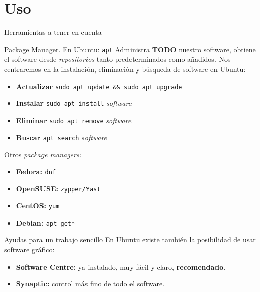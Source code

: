 \documentclass[12pt]{beamer}
\begin{document}
\section{Uso}
\begin{frame}[allowframebreaks]{Herramientas a tener en cuenta}
	\begin{block}{Package Manager. En Ubuntu: \texttt{apt}}
		Administra \textbf{TODO} nuestro software, obtiene el software desde \textit{repositorios} tanto predeterminados como añadidos. Nos centraremos en la instalación, eliminación y búsqueda de software en Ubuntu:
		\begin{itemize}
			\item \textbf{Actualizar} \texttt{sudo apt update \&\& sudo apt upgrade}
			\item \textbf{Instalar} \texttt{sudo apt install} \textit{software}
			\item \textbf{Eliminar} \texttt{sudo apt remove} \textit{software}
			\item \textbf{Buscar} \texttt{apt search} \textit{software}
		\end{itemize}
	\end{block}
	Otros \textit{package managers:}
	\begin{itemize}
		\item \textbf{Fedora:} \texttt{dnf}
		\item \textbf{OpenSUSE:} \texttt{zypper/Yast}
		\item \textbf{CentOS:} \texttt{yum}
		\item \textbf{Debian:} \texttt{apt-get*}
	\end{itemize}
	\begin{block}{Ayudas para un trabajo sencillo}
		En Ubuntu existe también la posibilidad de usar software gráfico:
		\begin{itemize}
			\item \textbf{Software Centre:} ya instalado, muy fácil y claro, \textbf{recomendado}.
			\item \textbf{Synaptic:} control más fino de todo el software.
		\end{itemize}
	\end{block}
\end{frame}
\end{document}
